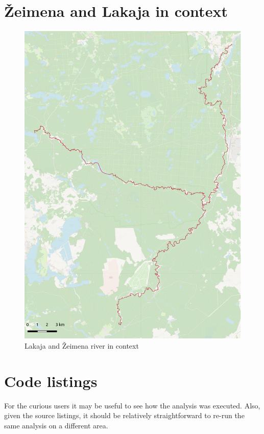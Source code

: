 \documentclass[a4paper]{article}
\begin{document}
\printbibliography

\begin{appendices}

\section{Žeimena and Lakaja in context}

\begin{figure}[H]
    \centering
    \includegraphics[width=148mm]{zeimena-pretty}
    \caption{Lakaja and Žeimena river in context}
\end{figure}

\section{Code listings}

For the curious users it may be useful to see how the analysis was executed.
Also, given the source listings, it should be relatively straightforward to
re-run the same analysis on a different area.


\end{appendices}
\end{document}
